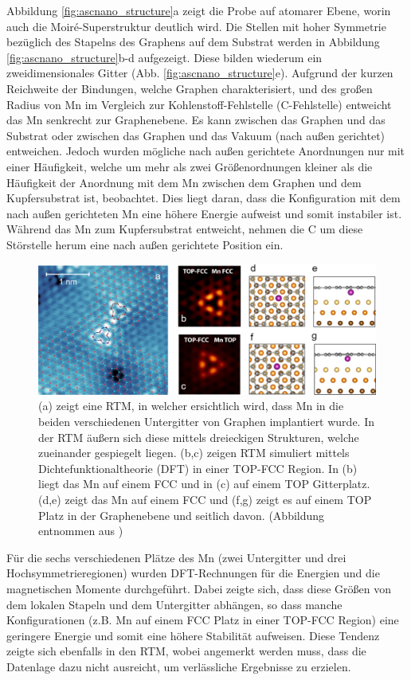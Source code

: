 Abbildung \ref{fig:ascnano_structure}a zeigt die Probe auf atomarer Ebene, worin auch die Moiré-Superstruktur deutlich wird.
Die Stellen mit hoher Symmetrie bezüglich des Stapelns des Graphens auf dem Substrat werden in 
Abbildung \ref{fig:ascnano_structure}b-d aufgezeigt.
Diese bilden wiederum ein zweidimensionales Gitter (Abb. \ref{fig:ascnano_structure}e).
Aufgrund der kurzen Reichweite der Bindungen, welche Graphen charakterisiert, und des großen Radius von Mn im Vergleich zur 
Kohlenstoff-Fehlstelle (C-Fehlstelle) entweicht das Mn senkrecht zur Graphenebene.
Es kann zwischen das Graphen und das Substrat oder zwischen das Graphen und das Vakuum (nach außen gerichtet) entweichen. 
Jedoch wurden mögliche nach außen gerichtete Anordnungen nur mit einer Häufigkeit, 
welche um mehr als zwei Größenordnungen kleiner als die Häufigkeit der Anordnung mit dem Mn 
zwischen dem Graphen und dem Kupfersubstrat ist, beobachtet.
Dies liegt daran, dass die Konfiguration mit dem nach außen gerichteten Mn eine höhere Energie aufweist und somit instabiler ist.
Während das Mn zum Kupfersubstrat entweicht, nehmen die C um diese Störstelle herum eine nach außen gerichtete Position ein.
\begin{figure}
    \centering
    \includegraphics[width = 0.95 \textwidth]{Plots/images_large_nn1c00139_0003.jpeg}
    \caption{(a) zeigt eine RTM, in welcher ersichtlich wird, dass Mn in die beiden verschiedenen Untergitter von Graphen implantiert wurde. In der
    RTM äußern sich diese mittels dreieckigen Strukturen, welche zueinander gespiegelt liegen.
    (b,c) zeigen RTM simuliert mittels Dichtefunktionaltheorie (DFT) in einer TOP-FCC Region. In (b) liegt das Mn auf einem FCC
    und in (c) auf einem TOP Gitterplatz. (d,e) zeigt das Mn auf einem FCC und (f,g) zeigt es auf einem TOP Platz in der Graphenebene und seitlich davon.
    (Abbildung entnommen  aus \cite{doi:10.1021/acsnano.1c00139})}
    \label{fig:ascnano_defect}
\end{figure}
Für die sechs verschiedenen Plätze des Mn (zwei Untergitter und drei Hochsymmetrieregionen) wurden DFT-Rechnungen für die Energien und die magnetischen Momente durchgeführt.
Dabei zeigte sich, dass diese Größen von dem lokalen Stapeln und dem Untergitter abhängen,
so dass manche Konfigurationen (z.B. Mn auf einem FCC Platz in einer TOP-FCC Region) eine geringere Energie und somit eine höhere Stabilität aufweisen.
Diese Tendenz zeigte sich ebenfalls in den RTM, wobei angemerkt werden muss, dass die Datenlage dazu nicht ausreicht, um
verlässliche Ergebnisse zu erzielen.  
\newpage
\FloatBarrier
